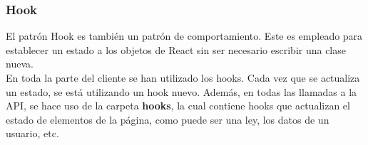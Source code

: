 \subsubsection{Hook}

El patrón Hook \cite{hooks} es también un patrón de comportamiento. Este es empleado para establecer un estado a los objetos de React sin ser necesario escribir una clase nueva.
\\

En toda la parte del cliente se han utilizado los hooks. Cada vez que se actualiza un estado, se está utilizando un hook nuevo. Además, en todas las llamadas a la API, se hace uso de la carpeta {\bf hooks}, la cual contiene hooks que actualizan el estado de elementos de la página, como puede ser una ley, los datos de un usuario, etc.